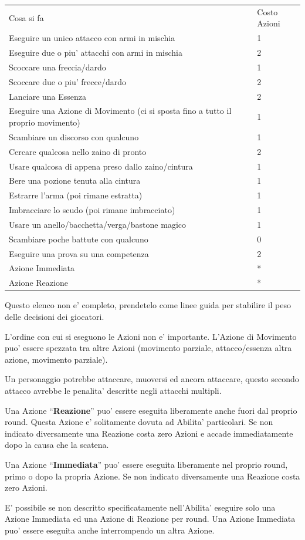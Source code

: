 \documentclass[a4paper,11pt,twoside,openany]{dndbook}
\begin{document}
\bigskip

\begin{tabular}[c]{@{}ll@{}}
\toprule 
Cosa si fa & Costo Azioni\tabularnewline
Eseguire un unico attacco con armi in mischia & 1\tabularnewline
Eseguire due o piu' attacchi con armi in mischia & 2\tabularnewline
Scoccare una freccia/dardo & 1\tabularnewline
Scoccare due o piu' frecce/dardo & 2\tabularnewline
Lanciare una Essenza & 2\tabularnewline
Eseguire una Azione di Movimento (ci si sposta fino a tutto
il proprio movimento) & 1\tabularnewline
Scambiare un discorso con qualcuno & 1\tabularnewline
Cercare qualcosa nello zaino di pronto & 2\tabularnewline
Usare qualcosa di appena preso dallo zaino/cintura & 1\tabularnewline
Bere una pozione tenuta alla cintura & 1\tabularnewline
Estrarre l'arma (poi rimane estratta) & 1\tabularnewline
Imbracciare lo scudo (poi rimane imbracciato) & 1\tabularnewline
Usare un anello/bacchetta/verga/bastone magico & 1\tabularnewline
Scambiare poche battute con qualcuno & 0\tabularnewline
Eseguire una prova su una competenza & 2\tabularnewline
Azione Immediata & {*}\tabularnewline
Azione Reazione & {*}\tabularnewline
\bottomrule
\end{tabular}

\smallskip

Questo elenco non e' completo, prendetelo come linee guida per stabilire il peso delle decisioni dei giocatori.

\bigskip

L'ordine con cui si eseguono le Azioni non e' importante. L'Azione di Movimento puo' essere spezzata tra altre Azioni (movimento parziale, attacco/essenza altra azione, movimento parziale).

Un personaggio potrebbe attaccare, muoversi ed ancora attaccare, questo secondo attacco avrebbe le penalita' descritte negli attacchi multipli.
\smallskip

Una Azione ``\textbf{Reazione}'' puo' essere eseguita liberamente anche fuori dal proprio round. Questa Azione e' solitamente dovuta ad Abilita' particolari. Se non indicato diversamente una Reazione costa zero Azioni e accade immediatamente dopo la causa che la scatena.
\smallskip

Una Azione ``\textbf{Immediata}'' puo' essere eseguita liberamente nel proprio round, primo o dopo la propria Azione. Se non indicato diversamente una Reazione costa zero Azioni.

E' possibile se non descritto specificatamente nell'Abilita' eseguire solo una Azione Immediata ed una Azione di Reazione per round. Una Azione Immediata puo' essere eseguita anche interrompendo un altra Azione.
\end{document}
